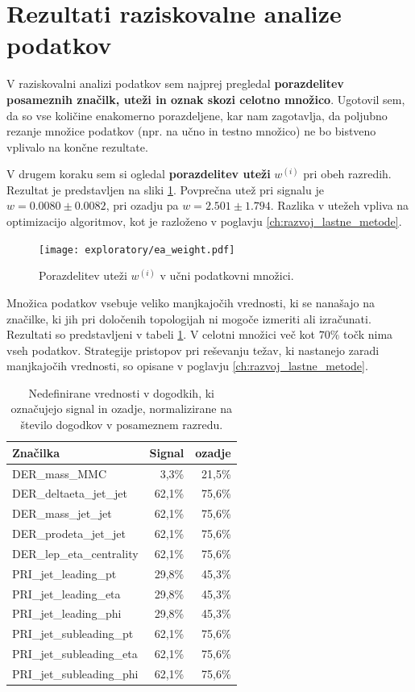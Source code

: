 \documentclass[11pt,a4paper,openany]{book}
\begin{document}
\section{Rezultati raziskovalne analize podatkov}
\label{sec:raziskovalna-analiza}

V raziskovalni analizi podatkov sem najprej pregledal \textbf{porazdelitev posameznih značilk, uteži in oznak skozi celotno množico}. Ugotovil sem, da so vse količine enakomerno porazdeljene, kar nam zagotavlja, da poljubno rezanje množice podatkov (npr. na učno in testno množico) ne bo bistveno vplivalo na končne rezultate.

V drugem koraku sem si ogledal \textbf{porazdelitev uteži} $w^{(i)}$ pri obeh razredih. Rezultat je predstavljen na sliki \ref{sl:weight}. Povprečna utež pri signalu je $w = 0.0080 \pm 0.0082$, pri ozadju pa $w = 2.501 \pm 1.794$. Razlika v utežeh vpliva na optimizacijo algoritmov, kot je razloženo v poglavju \ref{ch:razvoj_lastne_metode}.

\begin{figure}[ht]
	\centering
	\texttt{[image: exploratory/ea\_weight.pdf]} 
	\caption{Porazdelitev uteži $w^{(i)}$ v učni podatkovni množici.}
	\label{sl:weight}		
\end{figure}

Množica podatkov vsebuje veliko manjkajočih vrednosti, ki se nanašajo na značilke, ki jih pri določenih topologijah ni mogoče izmeriti ali izračunati. Rezultati so predstavljeni v tabeli \ref{tb:manjkajoce_vrednosti}. V celotni množici več kot $70\%$ točk nima vseh podatkov. Strategije pristopov pri reševanju težav, ki nastanejo zaradi manjkajočih vrednosti, so opisane v poglavju \ref{ch:razvoj_lastne_metode}.

\begin{table}[ht]
	\centering
	\begin{tabular}{lrr}
		\hline
		\textbf{Značilka} &         \textbf{Signal} &         \textbf{ozadje} \\
		\hline
		DER\_mass\_MMC            &  3,3\%  &  21,5\% \\
		DER\_deltaeta\_jet\_jet   &  62,1\% &  75,6\% \\
		DER\_mass\_jet\_jet       &  62,1\% &  75,6\% \\
		DER\_prodeta\_jet\_jet    &  62,1\% &  75,6\% \\
		DER\_lep\_eta\_centrality &  62,1\% &  75,6\% \\
		PRI\_jet\_leading\_pt     &  29,8\% &  45,3\% \\
		PRI\_jet\_leading\_eta    &  29,8\% &  45,3\% \\
		PRI\_jet\_leading\_phi    &  29,8\% &  45,3\% \\
		PRI\_jet\_subleading\_pt  &  62,1\% &  75,6\% \\
		PRI\_jet\_subleading\_eta &  62,1\% &  75,6\% \\
		PRI\_jet\_subleading\_phi &  62,1\% &  75,6\% \\
	\end{tabular}
	\caption{Nedefinirane vrednosti v dogodkih, ki označujejo signal in ozadje, normalizirane na število dogodkov v posameznem razredu.}
	\label{tb:manjkajoce_vrednosti}
\end{table}
\end{document}
